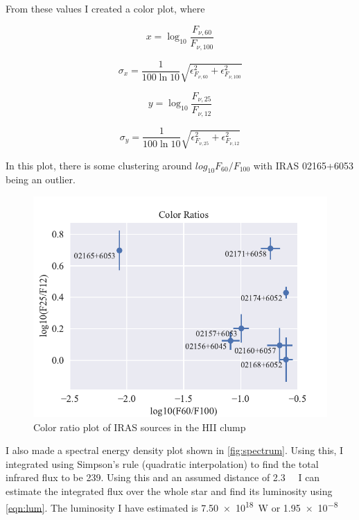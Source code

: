 \documentclass[]{article}
\begin{document}
From these values I created a color plot, where 

\begin{equation}
x = \log_{10}{\frac{F_{\nu, 60}}{F_{\nu, 100}}}
\end{equation}

\begin{equation}
\sigma_x = \frac{1}{100 \ln{10}}\sqrt{\epsilon_{F_{\nu,60}}^2 + \epsilon_{F_{\nu,100}}^2}
\end{equation}

\begin{equation}
y = \log_{10}{\frac{F_{\nu, 25}}{F_{\nu, 12}}}
\end{equation}

\begin{equation}
\sigma_y = \frac{1}{100 \ln{10}}\sqrt{\epsilon_{F_{\nu,25}}^2 + \epsilon_{F_{\nu,12}}^2}
\end{equation}

In this plot, there is some clustering around $log_10{F_{60}/F_{100}}$ with IRAS 02165+6053 being an outlier.

\begin{figure}[H]
	\centering
	\includegraphics[]{figs/colors.pdf}
	\caption{Color ratio plot of IRAS sources in the HII clump}
	\label{fig:colors}
\end{figure}

I also made a spectral energy density plot shown in \autoref{fig:spectrum}. Using this, I integrated using Simpson's rule (quadratic interpolation) to find the total infrared flux to be \SI{239}{\jansky}. Using this and an assumed distance of \SI{2.3}{\kilo\pc} I can estimate the integrated flux over the whole star and find its luminosity using \autoref{eqn:lum}. The luminosity I have estimated is \SI{7.50e18}{\watt} or \SI{1.95e-8}{\solarlum}
\end{document}
